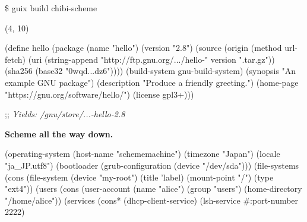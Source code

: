\documentclass{beamer}
\begin{document}
\begin{frame}[fragile]

  \begin{semiverbatim}
\$ guix build chibi-scheme
  \end{semiverbatim}

  \begin{textblock}{7}(4, 10)
  \end{textblock}

\end{frame}

\begin{frame}[fragile]
  \begin{semiverbatim}
    \small{
(define hello
  (\alert{package}
    (name "hello")
    (version "2.8")
    (source (\alert{origin}
              (method url-fetch)
              (uri (string-append
                    "http://ftp.gnu.org/\textrm{...}/hello-" version
                    ".tar.gz"))
              (sha256 (base32 "0wqd\textrm{...}dz6"))))
    (\alert{build-system} gnu-build-system)
    (synopsis "An example GNU package")
    (description "Produce a friendly greeting.")
    (home-page "https://gnu.org/software/hello/")
    (license gpl3+)))

;; \textsl{Yields: /gnu/store/\textrm{...}-hello-2.8}
}
  \end{semiverbatim}
\end{frame}

\begin{frame}
  \Huge{\textbf{Scheme all the way down.}}
\end{frame}

\begin{frame}[fragile]
  \begin{semiverbatim}
    \small{
(\alert{operating-system}
  (host-name "schememachine")
  (timezone "Japan")
  (locale "ja_JP.utf8")
  (bootloader (grub-configuration (device "/dev/sda")))
  (file-systems (cons (\alert{file-system}
                        (device "my-root")
                        (title 'label)
                        (mount-point "/")
                        (type "ext4"))
  (users (cons (\alert{user-account}
                 (name "alice")
                 (group "users")
                 (home-directory "/home/alice"))
  (services (cons* (dhcp-client-service)
                   (lsh-service #:port-number 2222)
    }
  \end{semiverbatim}
\end{frame}
\end{document}
